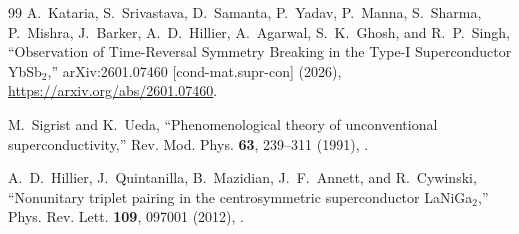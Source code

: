 \begin{thebibliography}{99}
A.~Kataria, S.~Srivastava, D.~Samanta, P.~Yadav, P.~Manna, S.~Sharma,
P.~Mishra, J.~Barker, A.~D.~Hillier, A.~Agarwal, S.~K.~Ghosh, and R.~P.~Singh,
``Observation of Time-Reversal Symmetry Breaking in the Type-I Superconductor YbSb$_2$,''
arXiv:2601.07460 [cond-mat.supr-con] (2026),
\url{https://arxiv.org/abs/2601.07460}.

M.~Sigrist and K.~Ueda,
``Phenomenological theory of unconventional superconductivity,''
Rev. Mod. Phys. \textbf{63}, 239--311 (1991),
.

A.~D.~Hillier, J.~Quintanilla, B.~Mazidian, J.~F.~Annett, and R.~Cywinski,
``Nonunitary triplet pairing in the centrosymmetric superconductor LaNiGa$_2$,''
Phys. Rev. Lett. \textbf{109}, 097001 (2012),
.
\end{thebibliography}
